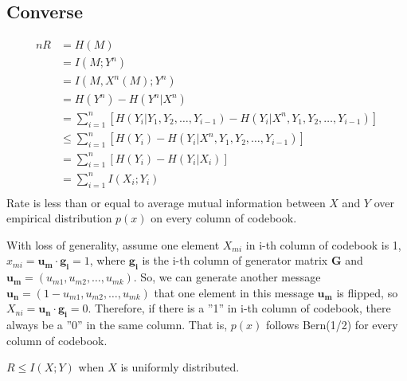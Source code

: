 \documentclass[12]{article}
\begin{document}
\subsection*{Converse}
\begin{equation*}
	\begin{split}
		nR&=H(M)\\
		&=I(M;Y^n)\\
		&=I(M,X^n(M);Y^n)\\
		&=H(Y^n)-H(Y^n|X^n)\\
		&=\sum_{i=1}^n[H(Y_i|Y_1,Y_2,\dots,Y_{i-1})-H(Y_i|X^n,Y_1,Y_2,\dots,Y_{i-1})]\\
		&\leq\sum_{i=1}^n[H(Y_i)-H(Y_i|X^n,Y_1,Y_2,\dots,Y_{i-1})]\\
		&=\sum_{i=1}^n[H(Y_i)-H(Y_i|X_i)]\\
		&=\sum_{i=1}^nI(X_i;Y_i)\\
	\end{split}
\end{equation*}
Rate is less than or equal to average mutual information between $X$ and $Y$ over empirical
distribution $p(x)$ on every column of codebook. 

With loss of generality, assume one element $X_{mi}$ in i-th column of codebook is 1, $x_{mi}
= \mathbf{u_m\cdot g_i}=1$, where $\mathbf{g_i}$ is the i-th column of generator matrix $\mathbf{G}$ and  $\mathbf{u_m}
= (u_{m1},u_{m2},\ldots,u_{mk})$. So, we can generate another message $\mathbf{u_n}=(1-u_{m1},u_{m2},\ldots,u_{mk})$
that one element in this message $\mathbf{u_m}$ is flipped, so $X_{ni}=\mathbf{u_n\cdot g_i}=0$.
Therefore, if there is a ''1'' in i-th column of codebook, there always be a ''0''
in the same column. That is, $p(x)$ follows Bern(1/2) for every column of codebook.

$R\leq I(X;Y)$ when $X$ is uniformly distributed.\\
\end{document}
